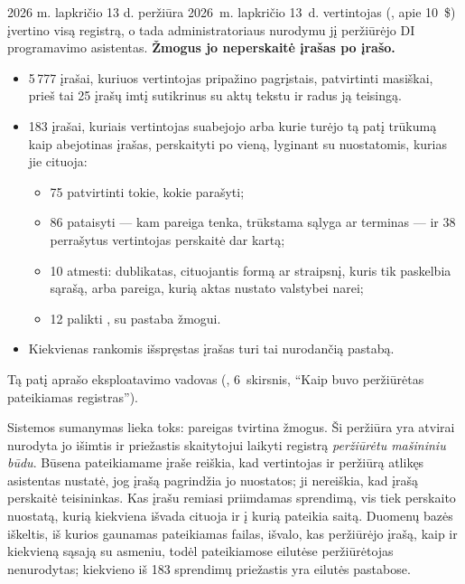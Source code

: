 \begin{notebox}{2026 m. lapkričio 13 d. peržiūra}
2026~m. lapkričio 13~d. vertintojas (, apie 10~\$) įvertino visą
registrą, o tada administratoriaus nurodymu jį peržiūrėjo DI programavimo asistentas.
\textbf{Žmogus jo neperskaitė įrašas po įrašo.}

\begin{itemize}
  \item 5\,777 įrašai, kuriuos vertintojas pripažino pagrįstais, patvirtinti masiškai, prieš tai
    25 įrašų imtį sutikrinus su aktų tekstu ir radus ją teisingą.
  \item 183 įrašai, kuriais vertintojas suabejojo arba kurie turėjo tą patį trūkumą kaip
    abejotinas įrašas, perskaityti po vieną, lyginant su nuostatomis, kurias jie cituoja:
    \begin{itemize}
      \item 75 patvirtinti tokie, kokie parašyti;
      \item 86 pataisyti --- kam pareiga tenka, trūkstama sąlyga ar terminas --- ir 38 perrašytus
        vertintojas perskaitė dar kartą;
      \item 10 atmesti: dublikatas, cituojantis formą ar straipsnį, kuris tik paskelbia sąrašą,
        arba pareiga, kurią aktas nustato valstybei narei;
      \item 12 palikti , su pastaba žmogui.
    \end{itemize}
  \item Kiekvienas rankomis išspręstas įrašas turi tai nurodančią pastabą.
\end{itemize}

Tą patį aprašo eksploatavimo vadovas (, 6~skirsnis, \enquote{Kaip
buvo peržiūrėtas pateikiamas registras}).
\end{notebox}

Sistemos sumanymas lieka toks: pareigas tvirtina žmogus. Ši peržiūra yra atvirai nurodyta jo išimtis ir
priežastis skaitytojui laikyti registrą \emph{peržiūrėtu mašininiu būdu}. Būsena 
pateikiamame įraše reiškia, kad vertintojas ir peržiūrą atlikęs asistentas nustatė, jog įrašą
pagrindžia jo nuostatos; ji nereiškia, kad įrašą perskaitė teisininkas. Kas įrašu remiasi
priimdamas sprendimą, vis tiek perskaito nuostatą, kurią kiekviena išvada cituoja ir į kurią
pateikia saitą. Duomenų bazės iškeltis, iš kurios gaunamas pateikiamas failas, išvalo, kas peržiūrėjo įrašą,
kaip ir kiekvieną sąsają su asmeniu, todėl pateikiamose eilutėse peržiūrėtojas nenurodytas;
kiekvieno iš 183 sprendimų priežastis yra eilutės pastabose.



